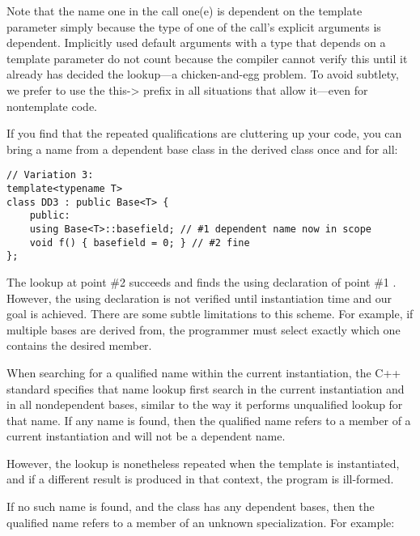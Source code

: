 Note that the name one in the call one(e) is dependent on the template parameter simply because the type of one of the call’s explicit arguments is dependent. Implicitly used default arguments with a type that depends on a template parameter do not count because the compiler cannot verify this until it already has decided the lookup—a chicken-and-egg problem. To avoid subtlety, we prefer to use the this-> prefix in all situations that allow it—even for nontemplate code.

If you find that the repeated qualifications are cluttering up your code, you can bring a name from a dependent base class in the derived class once and for all:

\begin{lstlisting}[style=styleCXX]
// Variation 3:
template<typename T>
class DD3 : public Base<T> {
	public:
	using Base<T>::basefield; // #1 dependent name now in scope
	void f() { basefield = 0; } // #2 fine
};
\end{lstlisting}

The lookup at point \#2 succeeds and finds the using declaration of point \#1 . However, the using declaration is not verified until instantiation time and our goal is achieved. There are some subtle limitations to this scheme. For example, if multiple bases are derived from, the programmer must select exactly which one contains the desired member.

When searching for a qualified name within the current instantiation, the C++ standard specifies that name lookup first search in the current instantiation and in all nondependent bases, similar to the way it performs unqualified lookup for that name. If any name is found, then the qualified name refers to a member of a current instantiation and will not be a dependent name.

\begin{tcolorbox}[colback=webgreen!5!white,colframe=webgreen!75!black]
\hspace*{0.75cm}However, the lookup is nonetheless repeated when the template is instantiated, and if a different result is produced in that context, the program is ill-formed.
\end{tcolorbox}

If no such name is found, and the class has any dependent bases, then the qualified name refers to a member of an unknown specialization. For example:

